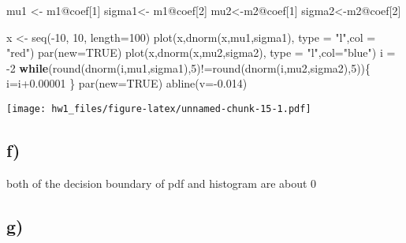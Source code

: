\documentclass[
]{article}
\newenvironment{Shaded}{\begin{snugshade}}{\end{snugshade}}
\newcommand{\AttributeTok}[1]{\textcolor[rgb]{0.77,0.63,0.00}{#1}}
\newcommand{\ConstantTok}[1]{\textcolor[rgb]{0.00,0.00,0.00}{#1}}
\newcommand{\ControlFlowTok}[1]{\textcolor[rgb]{0.13,0.29,0.53}{\textbf{#1}}}
\newcommand{\DecValTok}[1]{\textcolor[rgb]{0.00,0.00,0.81}{#1}}
\newcommand{\FloatTok}[1]{\textcolor[rgb]{0.00,0.00,0.81}{#1}}
\newcommand{\FunctionTok}[1]{\textcolor[rgb]{0.00,0.00,0.00}{#1}}
\newcommand{\NormalTok}[1]{#1}
\newcommand{\OtherTok}[1]{\textcolor[rgb]{0.56,0.35,0.01}{#1}}
\newcommand{\SpecialCharTok}[1]{\textcolor[rgb]{0.00,0.00,0.00}{#1}}
\newcommand{\StringTok}[1]{\textcolor[rgb]{0.31,0.60,0.02}{#1}}
\begin{document}
\begin{Shaded}
\begin{Highlighting}[]
\NormalTok{mu1 }\OtherTok{\textless{}{-}}\NormalTok{ m1}\SpecialCharTok{@}\NormalTok{coef[}\DecValTok{1}\NormalTok{]}
\NormalTok{sigma1}\OtherTok{\textless{}{-}}\NormalTok{ m1}\SpecialCharTok{@}\NormalTok{coef[}\DecValTok{2}\NormalTok{]}
\NormalTok{mu2}\OtherTok{\textless{}{-}}\NormalTok{m2}\SpecialCharTok{@}\NormalTok{coef[}\DecValTok{1}\NormalTok{]}
\NormalTok{sigma2}\OtherTok{\textless{}{-}}\NormalTok{m2}\SpecialCharTok{@}\NormalTok{coef[}\DecValTok{2}\NormalTok{]}

\NormalTok{x }\OtherTok{\textless{}{-}} \FunctionTok{seq}\NormalTok{(}\SpecialCharTok{{-}}\DecValTok{10}\NormalTok{, }\DecValTok{10}\NormalTok{, }\AttributeTok{length=}\DecValTok{100}\NormalTok{)}
\FunctionTok{plot}\NormalTok{(x,}\FunctionTok{dnorm}\NormalTok{(x,mu1,sigma1), }\AttributeTok{type =} \StringTok{"l"}\NormalTok{,}\AttributeTok{col =} \StringTok{"red"}\NormalTok{)}
\FunctionTok{par}\NormalTok{(}\AttributeTok{new=}\ConstantTok{TRUE}\NormalTok{)}
\FunctionTok{plot}\NormalTok{(x,}\FunctionTok{dnorm}\NormalTok{(x,mu2,sigma2), }\AttributeTok{type =} \StringTok{"l"}\NormalTok{,}\AttributeTok{col=}\StringTok{"blue"}\NormalTok{)}
\NormalTok{i }\OtherTok{=} \SpecialCharTok{{-}}\DecValTok{2}
\ControlFlowTok{while}\NormalTok{(}\FunctionTok{round}\NormalTok{(}\FunctionTok{dnorm}\NormalTok{(i,mu1,sigma1),}\DecValTok{5}\NormalTok{)}\SpecialCharTok{!=}\FunctionTok{round}\NormalTok{(}\FunctionTok{dnorm}\NormalTok{(i,mu2,sigma2),}\DecValTok{5}\NormalTok{))\{}
\NormalTok{  i}\OtherTok{=}\NormalTok{i}\FloatTok{+0.00001}
\NormalTok{\}}
\FunctionTok{par}\NormalTok{(}\AttributeTok{new=}\ConstantTok{TRUE}\NormalTok{)}
\FunctionTok{abline}\NormalTok{(}\AttributeTok{v=}\SpecialCharTok{{-}}\FloatTok{0.014}\NormalTok{)}
\end{Highlighting}
\end{Shaded}

\texttt{[image: hw1\_files/figure-latex/unnamed-chunk-15-1.pdf]}

\hypertarget{f-1}{%
\subsection{f)}\label{f-1}}

both of the decision boundary of pdf and histogram are about 0

\hypertarget{g-1}{%
\subsection{g)}\label{g-1}}
\end{document}

